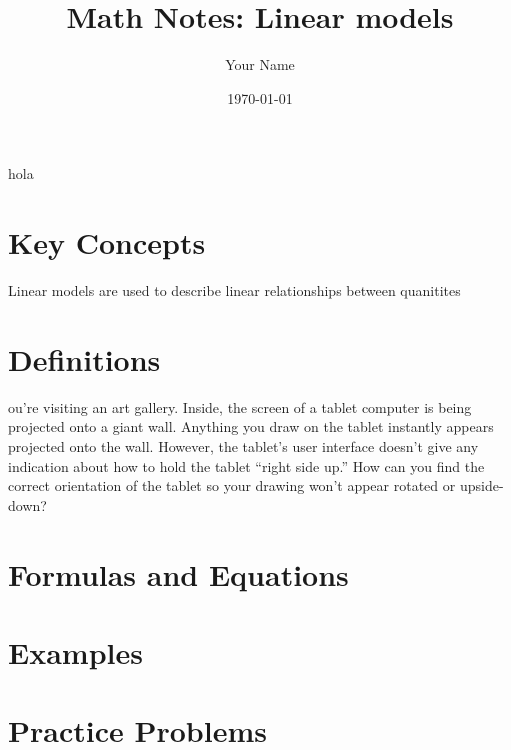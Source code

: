 \documentclass{article}
\title{Math Notes: Linear models}
\author{Your Name}
\date{\today}
\begin{document}
   \maketitle
hola
   \section{Key Concepts}

   Linear models are used to describe linear relationships between quanitites

   \section{Definitions}
ou’re visiting an art gallery. Inside, the screen of a tablet
computer is being projected onto a giant wall. Anything you draw
on the tablet instantly appears projected onto the wall. However, the
tablet’s user interface doesn’t give any indication about how to hold
the tablet “right side up.” How can you find the correct orientation
of the tablet so your drawing won’t appear rotated or upside-down?

   \section{Formulas and Equations}

   \section{Examples}

   \section{Practice Problems}

   
\end{document}
